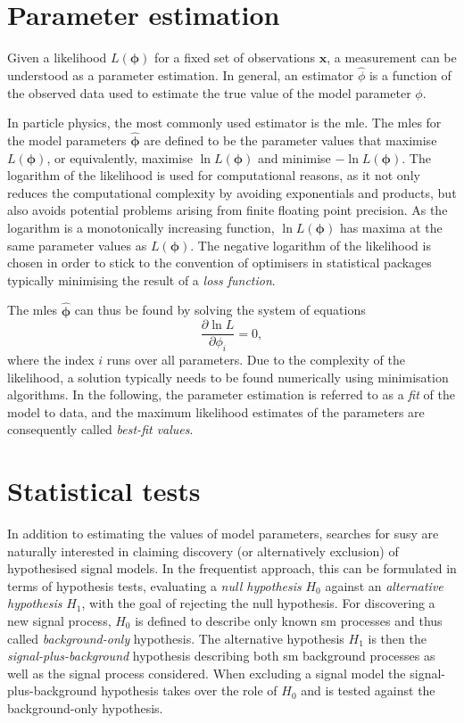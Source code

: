 \section{Parameter estimation}

Given a likelihood $L(\boldsymbol{\phi})$ for a fixed set of observations $\boldsymbol{x}$, a measurement can be understood as a parameter estimation. In general, an estimator $\hat{\phi}$ is a function of the observed data used to estimate the true value of the model parameter $\phi$.

In particle physics, the most commonly used estimator is the \gls{mle}. The \glspl{mle} for the model parameters $\boldsymbol{\hat{\phi}}$ are defined to be the parameter values that maximise $L(\boldsymbol{\phi})$, or equivalently, maximise $\ln{L(\boldsymbol{\phi})}$ and minimise $-\ln{L(\boldsymbol{\phi})}$. The logarithm of the likelihood is used for computational reasons, as it not only reduces the computational complexity by avoiding exponentials and products, but also avoids potential problems arising from finite floating point precision. As the logarithm is a monotonically increasing function, $\ln{L(\boldsymbol{\phi})}$ has maxima at the same parameter values as ${L(\boldsymbol{\phi})}$. The negative logarithm of the likelihood is chosen in order to stick to the convention of optimisers in statistical packages typically minimising the result of a \textit{loss function}.

The \glspl{mle} $\boldsymbol{\hat{\phi}}$ can thus be found by solving the system of equations
\begin{equation}
 \frac{\partial \ln L}{\partial\phi_i} = 0,
\end{equation}
where the index $i$ runs over all parameters. Due to the complexity of the likelihood, a solution typically needs to be found numerically using minimisation algorithms. In the following, the parameter estimation is referred to as a \textit{fit} of the model to data, and the maximum likelihood estimates of the parameters are consequently called \textit{best-fit values}.

\section{Statistical tests}

In addition to estimating the values of model parameters, searches for \gls{susy} are naturally interested in claiming discovery (or alternatively exclusion) of hypothesised signal models. In the frequentist approach, this can be formulated in terms of hypothesis tests, evaluating a \textit{null hypothesis} $H_0$ against an \textit{alternative hypothesis} $H_1$, with the goal of rejecting the null hypothesis. For discovering a new signal process, $H_0$ is defined to describe only known \gls{sm} processes and thus called \textit{background-only} hypothesis. The alternative hypothesis $H_1$ is then the \textit{signal-plus-background} hypothesis describing both \gls{sm} background processes as well as the signal process considered. When excluding a signal model the signal-plus-background hypothesis takes over the role of $H_0$ and is tested against the background-only hypothesis.

